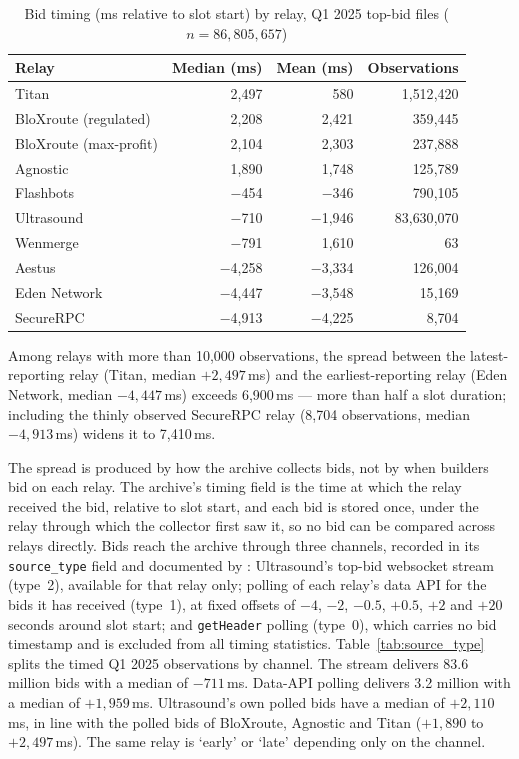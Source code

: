 \documentclass[11pt]{article}
\begin{document}
\begin{table}[!htbp]
\centering
\caption{Bid timing (ms relative to slot start) by relay, Q1 2025 top-bid
files ($n = 86{,}805{,}657$)}
\label{tab:relay_timing}
\begin{tabular}{lrrr}
\toprule
Relay & Median (ms) & Mean (ms) & Observations \\
\midrule
Titan & 2{,}497 & 580 & 1{,}512{,}420 \\
BloXroute (regulated) & 2{,}208 & 2{,}421 & 359{,}445 \\
BloXroute (max-profit) & 2{,}104 & 2{,}303 & 237{,}888 \\
Agnostic & 1{,}890 & 1{,}748 & 125{,}789 \\
Flashbots & $-$454 & $-$346 & 790{,}105 \\
Ultrasound & $-$710 & $-$1{,}946 & 83{,}630{,}070 \\
Wenmerge & $-$791 & 1{,}610 & 63 \\
Aestus & $-$4{,}258 & $-$3{,}334 & 126{,}004 \\
Eden Network & $-$4{,}447 & $-$3{,}548 & 15{,}169 \\
SecureRPC & $-$4{,}913 & $-$4{,}225 & 8{,}704 \\
\bottomrule
\end{tabular}
\end{table}

Among relays with more than 10,000 observations, the spread between the
latest-reporting relay (Titan, median $+2{,}497$\,ms) and the
earliest-reporting relay (Eden Network, median $-4{,}447$\,ms) exceeds
6,900\,ms --- more than half a slot duration; including the thinly observed
SecureRPC relay (8,704 observations, median $-4{,}913$\,ms) widens it to
7,410\,ms.

The spread is produced by how the archive collects bids, not by when builders
bid on each relay. The archive's timing field is the time at which the relay
received the bid, relative to slot start, and each bid is stored once, under
the relay through which the collector first saw it, so no bid can be compared
across relays directly. Bids reach the archive through three channels,
recorded in its \texttt{source\_type} field and documented by
\citet{relayscan2024}: Ultrasound's top-bid websocket stream (type~2),
available for that relay only; polling of each relay's data API for the bids
it has received (type~1), at fixed offsets of $-4$, $-2$, $-0.5$, $+0.5$,
$+2$ and $+20$ seconds around slot start; and \texttt{getHeader} polling
(type~0), which carries no bid timestamp and is excluded from all timing
statistics. Table~\ref{tab:source_type} splits the timed Q1 2025 observations
by channel. The stream delivers 83.6 million bids with a median of
$-711$\,ms. Data-API polling delivers 3.2 million with a median of
$+1{,}959$\,ms. Ultrasound's own polled bids have a median of $+2{,}110$\,ms,
in line with the polled bids of BloXroute, Agnostic and Titan ($+1{,}890$ to
$+2{,}497$\,ms). The same relay is `early' or `late' depending only on the
channel.
\end{document}
